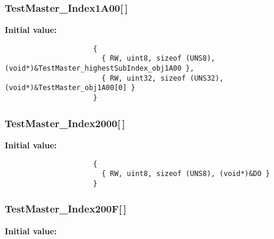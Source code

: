 \subsubsection{ {\bf Test\-Master\_\-Index1A00}[$\,$]}\label{TestMasterMicroMod_2TestMaster_8c_40ae451c86748d18a0418b0501b5e290}


\textbf{Initial value:}

\begin{Code}\begin{verbatim} 
                     {
                       { RW, uint8, sizeof (UNS8), (void*)&TestMaster_highestSubIndex_obj1A00 },
                       { RW, uint32, sizeof (UNS32), (void*)&TestMaster_obj1A00[0] }
                     }
\end{verbatim}\end{Code}
\subsubsection{ {\bf Test\-Master\_\-Index2000}[$\,$]}\label{TestMasterMicroMod_2TestMaster_8c_f1df85cf209408a358db50073027404e}


\textbf{Initial value:}

\begin{Code}\begin{verbatim} 
                     {
                       { RW, uint8, sizeof (UNS8), (void*)&DO }
                     }
\end{verbatim}\end{Code}
\subsubsection{ {\bf Test\-Master\_\-Index200F}[$\,$]}\label{TestMasterMicroMod_2TestMaster_8c_4bdcfcedd83d71ae710fa2780716f888}


\textbf{Initial value:}

